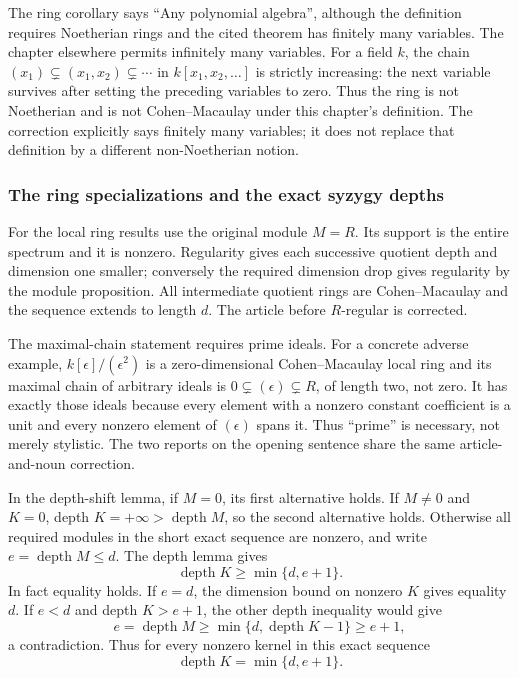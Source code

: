 The ring corollary says ``Any polynomial algebra'', although the definition requires Noetherian rings and the cited theorem has finitely many variables. The chapter elsewhere permits infinitely many variables. For a field \(k\), the chain \((x_1)\subsetneq(x_1,x_2)\subsetneq\cdots\) in \(k[x_1,x_2,\ldots]\) is strictly increasing: the next variable survives after setting the preceding variables to zero. Thus the ring is not Noetherian and is not Cohen--Macaulay under this chapter's definition. The correction explicitly says finitely many variables; it does not replace that definition by a different non-Noetherian notion.

\subsubsection{The ring specializations and the exact syzygy depths}\label{algebra-proof-019-the-ring-specializations-and-the-exact-syzygy-depths}

For the local ring results use the original module \(M=R\). Its support is the entire spectrum and it is nonzero. Regularity gives each successive quotient depth and dimension one smaller; conversely the required dimension drop gives regularity by the module proposition. All intermediate quotient rings are Cohen--Macaulay and the sequence extends to length \(d\). The article before \(R\)-regular is corrected.

The maximal-chain statement requires prime ideals. For a concrete adverse example, \(k[\epsilon]/(\epsilon^2)\) is a zero-dimensional Cohen--Macaulay local ring and its maximal chain of arbitrary ideals is \(0\subsetneq(\epsilon)\subsetneq R\), of length two, not zero. It has exactly those ideals because every element with a nonzero constant coefficient is a unit and every nonzero element of \((\epsilon)\) spans it. Thus ``prime'' is necessary, not merely stylistic. The two reports on the opening sentence share the same article-and-noun correction.

In the depth-shift lemma, if \(M=0\), its first alternative holds. If \(M\ne0\) and \(K=0\), depth \(K=+\infty>\operatorname{depth}M\), so the second alternative holds. Otherwise all required modules in the short exact sequence are nonzero, and write \(e=\operatorname{depth}M\le d\). The depth lemma gives \[
 \operatorname{depth}K\ge\min\{d,e+1\}.
\] In fact equality holds. If \(e=d\), the dimension bound on nonzero \(K\) gives equality \(d\). If \(e<d\) and depth \(K>e+1\), the other depth inequality would give \[
 e=\operatorname{depth}M\ge
 \min\{d,\operatorname{depth}K-1\}\ge e+1,
\] a contradiction. Thus for every nonzero kernel in this exact sequence \[
 \operatorname{depth}K=\min\{d,e+1\}.
\]

